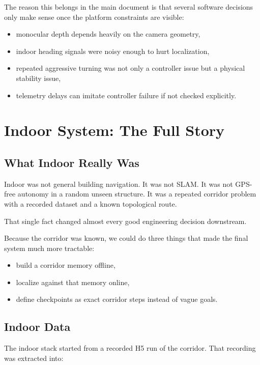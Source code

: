 \documentclass[11pt]{article}
\begin{document}
The reason this belongs in the main document is that several software decisions
only make sense once the platform constraints are visible:

\begin{itemize}[nosep]
  \item monocular depth depends heavily on the camera geometry,
  \item indoor heading signals were noisy enough to hurt localization,
  \item repeated aggressive turning was not only a controller issue but a physical
  stability issue,
  \item telemetry delays can imitate controller failure if not checked explicitly.
\end{itemize}

\section{Indoor System: The Full Story}

\subsection{What Indoor Really Was}

Indoor was not general building navigation. It was not SLAM. It was not GPS-free
autonomy in a random unseen structure. It was a repeated corridor problem with a
recorded dataset and a known topological route.

That single fact changed almost every good engineering decision downstream.

Because the corridor was known, we could do three things that made the final system
much more tractable:

\begin{itemize}[nosep]
  \item build a corridor memory offline,
  \item localize against that memory online,
  \item define checkpoints as exact corridor steps instead of vague goals.
\end{itemize}

\subsection{Indoor Data}

The indoor stack started from a recorded H5 run of the corridor. That recording was
extracted into:
\end{document}
